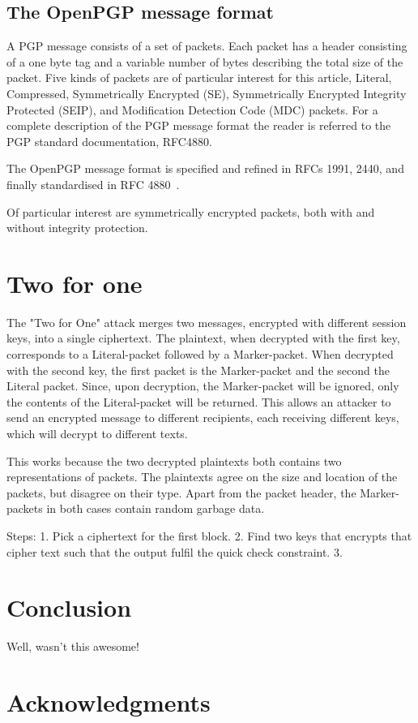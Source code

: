 \documentclass[runningheads,a4paper]{llncs}[2018/03/10]
\newif\ifanon
\begin{document}
\subsection{The OpenPGP message format}

A PGP message consists of a set of packets. Each packet has a header consisting 
of a one byte tag and a variable
number of bytes describing the total size of the packet. Five kinds of
packets are of particular interest for this article, Literal,
Compressed, Symmetrically Encrypted (SE), Symmetrically Encrypted
Integrity Protected (SEIP), and Modification Detection Code (MDC)
packets. For a complete description of the PGP message format the
reader is referred to the PGP standard documentation, RFC4880.

The OpenPGP message format is specified and refined in RFCs 1991,
2440, and finally standardised in RFC
4880~\cite{callas1998rfc,callas2007openpgp}.

Of particular interest are symmetrically encrypted packets, both with
and without integrity protection.


\section{Two for one}\label{sec:twoforone}

The "Two for One" attack merges two messages, encrypted with different session keys, 
into a single ciphertext. The plaintext, when decrypted with the first key, 
corresponds to a Literal-packet followed by a Marker-packet. When decrypted with the second 
key, the first packet is the Marker-packet and the second the Literal packet. 
Since, upon decryption, the Marker-packet will be ignored, only the contents of the Literal-packet will be returned. This allows an attacker to send an encrypted message to different recipients, each receiving different keys, which will decrypt to different texts.


This works because the two decrypted plaintexts both contains two representations 
of packets. The plaintexts agree on the size and location of the packets, but 
disagree on their type. Apart 
from the packet header, the Marker-packets in both cases contain random garbage 
data. 

Steps:
1. Pick a ciphertext for the first block.
2. Find two keys that encrypts that cipher text such that the output fulfil the quick check constraint.
3.

\section{Conclusion}\label{sec:conclusion}
Well, wasn't this awesome!

\section*{Acknowledgments}
\ifanon
	Removed for blind review.
\else
	
\fi

\clearpage



\end{document}
